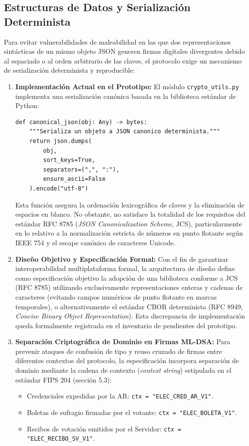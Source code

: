 \subsection{Estructuras de Datos y Serialización Determinista}

Para evitar vulnerabilidades de maleabilidad en las que dos representaciones sintácticas de un mismo objeto JSON generen firmas digitales divergentes debido al espaciado o al orden arbitrario de las claves, el protocolo exige un mecanismo de serialización determinista y reproducible:

\begin{enumerate}
	\item \textbf{Implementación Actual en el Prototipo:} El módulo \texttt{crypto\_utils.py} implementa una serialización canónica basada en la biblioteca estándar de Python:
\begin{verbatim}
def canonical_json(obj: Any) -> bytes:
    """Serializa un objeto a JSON canonico determinista."""
    return json.dumps(
        obj,
        sort_keys=True,
        separators=(",", ":"),
        ensure_ascii=False
    ).encode("utf-8")
\end{verbatim}
	Esta función asegura la ordenación lexicográfica de claves y la eliminación de espacios en blanco. No obstante, no satisface la totalidad de los requisitos del estándar RFC 8785 (\textit{JSON Canonicalization Scheme}, JCS), particularmente en lo relativo a la normalización estricta de números en punto flotante según IEEE 754 y el escape canónico de caracteres Unicode.
	
	\item \textbf{Diseño Objetivo y Especificación Formal:} Con el fin de garantizar interoperabilidad multiplataforma formal, la arquitectura de diseño define como especificación objetivo la adopción de una biblioteca conforme a JCS (RFC 8785) utilizando exclusivamente representaciones enteras y cadenas de caracteres (evitando campos numéricos de punto flotante en marcas temporales), o alternativamente el estándar CBOR determinista (RFC 8949, \textit{Concise Binary Object Representation}). Esta discrepancia de implementación queda formalmente registrada en el inventario de pendientes del prototipo.

	\item \textbf{Separación Criptográfica de Dominio en Firmas ML-DSA:} Para prevenir ataques de confusión de tipo y reuso cruzado de firmas entre diferentes contextos del protocolo, la especificación incorpora separación de dominio mediante la cadena de contexto (\textit{context string}) estipulada en el estándar FIPS 204 (sección 5.3):
	\begin{itemize}
		\item Credenciales expedidas por la AR: \texttt{ctx = "ELEC\_CRED\_AR\_V1"}.
		\item Boletas de sufragio firmadas por el votante: \texttt{ctx = "ELEC\_BOLETA\_V1"}.
		\item Recibos de votación emitidos por el Servidor: \texttt{ctx = "ELEC\_RECIBO\_SV\_V1"}.
	\end{itemize}
\end{enumerate}
